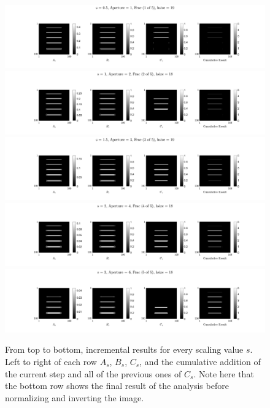 \documentclass{edger}
\begin{document}
\begin{figure}[H]
\centering
\includegraphics[width = \textwidth]{"SFI,s = 0.5, Aperture = 1, Frac (1 of 5), hsize = 19"}
\includegraphics[width = \textwidth]{"SFI,s = 1, Aperture = 2, Frac (2 of 5), hsize = 18"}
\includegraphics[width = \textwidth]{"SFI,s = 1.5, Aperture = 3, Frac (3 of 5), hsize = 19"}
\includegraphics[width = \textwidth]{"SFI,s = 2, Aperture = 4, Frac (4 of 5), hsize = 18"}
\includegraphics[width = \textwidth]{"SFI,s = 3, Aperture = 6, Frac (5 of 5), hsize = 18"}
\caption{From top to bottom, incremental results for every scaling value $s$. Left to right of each row $A_s$, $B_s$, $C_s$, and the cumulative addition of the current step and all of the previous ones of $C_s$. Note here that the bottom row shows the final result of the analysis before normalizing and inverting the image. }
\label{fig:Fracture Mapping Analysis}
\end{figure}
\end{document}
